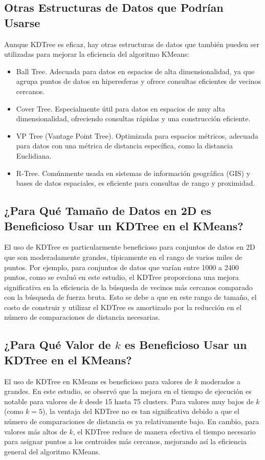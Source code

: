 \documentclass[conference]{IEEEtran}
\begin{document}
\subsection{Otras Estructuras de Datos que Podrían Usarse}
Aunque KDTree es eficaz, hay otras estructuras de datos que también pueden ser utilizadas para mejorar la eficiencia del algoritmo KMeans:
\begin{itemize}
    \item{Ball Tree\cite{bhatia2010survey}.} Adecuada para datos en espacios de alta dimensionalidad, ya que agrupa puntos de datos en hiperesferas y ofrece consultas eficientes de vecinos cercanos.
    \item{Cover Tree\cite{beygelzimer2006cover}.} Especialmente útil para datos en espacios de muy alta dimensionalidad, ofreciendo consultas rápidas y una construcción eficiente.
    \item{VP Tree (Vantage Point Tree)\cite{fu2000dynamic}.} Optimizada para espacios métricos, adecuada para datos con una métrica de distancia específica, como la distancia Euclidiana.
    \item{R-Tree\cite{guttman1984r}\cite{bhatia2010survey}.} Comúnmente usada en sistemas de información geográfica (GIS) y bases de datos espaciales, es eficiente para consultas de rango y proximidad.
\end{itemize}

\subsection{¿Para Qué Tamaño de Datos en 2D es Beneficioso Usar un KDTree en el KMeans?}
El uso de KDTree es particularmente beneficioso para conjuntos de datos en 2D que son moderadamente grandes, típicamente en el rango de varios miles de puntos. Por ejemplo, para conjuntos de datos que varían entre 1000 a 2400 puntos, como se evaluó en este estudio, el KDTree proporciona una mejora significativa en la eficiencia de la búsqueda de vecinos más cercanos comparado con la búsqueda de fuerza bruta. Esto se debe a que en este rango de tamaño, el costo de construir y utilizar el KDTree es amortizado por la reducción en el número de comparaciones de distancia necesarias.

\subsection{¿Para Qué Valor de $k$ es Beneficioso Usar un KDTree en el KMeans?}
El uso de KDTree en KMeans es beneficioso para valores de $k$ moderados a grandes. En este estudio, se observó que la mejora en el tiempo de ejecución es notable para valores de $k$ desde 15 hasta 75 clusters. Para valores muy bajos de $k$ (como $k = 5$), la ventaja del KDTree no es tan significativa debido a que el número de comparaciones de distancia es ya relativamente bajo. En cambio, para valores más altos de $k$, el KDTree reduce de manera efectiva el tiempo necesario para asignar puntos a los centroides más cercanos, mejorando así la eficiencia general del algoritmo KMeans.
\end{document}

